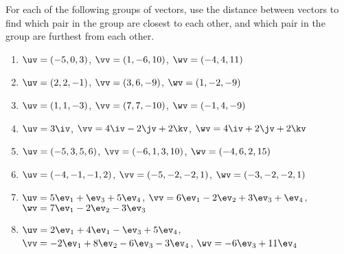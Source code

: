 \begin{exercise} \label{ex:} 
For each of the following groups of vectors, use the distance between vectors to find which pair in the group are closest to each other, and which pair in the group are furthest from each other. 
\begin{enumerate} \sloppy
\item \(\uv=(-5,0,3)\), \(\vv=(1,-6,10)\), \(\wv=(-4,4,11)\)

\item \(\uv=(2,2,-1)\), \(\vv=(3,6,-9)\), \(\wv=(1,-2,-9)\)

\item \(\uv=(1,1,-3)\), \(\vv=(7,7,-10)\), \(\wv=(-1,4,-9)\)

\item \(\uv=3\iv\), \(\vv=4\iv-2\jv+2\kv\), \(\wv=4\iv+2\jv+2\kv\)

\item \(\uv=(-5,3,5,6)\), \(\vv=(-6,1,3,10)\), \(\wv=(-4,6,2,15)\)

\item \(\uv=(-4,-1,-1,2)\), \(\vv=( -5,-2,-2,1)\), \(\wv=(-3,-2,-2,1)\)

\item \(\uv=5\ev_1+\ev_3+5\ev_4\), \(\vv=6\ev_1-2\ev_2+3\ev_3+\ev_4\), \(\wv=7\ev_1-2\ev_2-3\ev_3\)

\item \(\uv= 2\ev_1+4\ev_1-\ev_3+5\ev_4\), \(\vv=-2\ev_1+8\ev_2-6\ev_3-3\ev_4\), \(\wv=-6\ev_3+11\ev_4\)

\end{enumerate}
\end{exercise}





